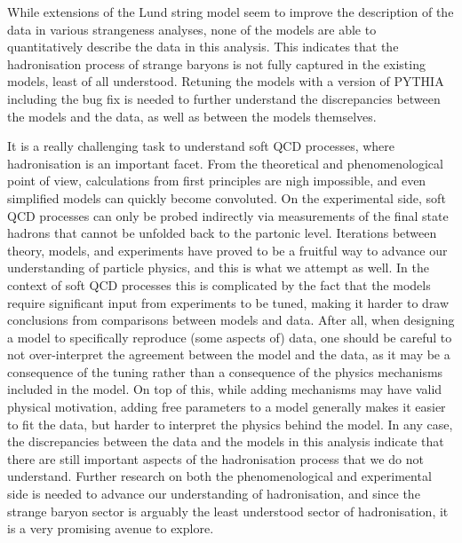   While extensions of the Lund string model seem to improve the description of the data in various strangeness analyses, none of the models are able to quantitatively describe the data in this analysis. This indicates that the hadronisation process of strange baryons is not fully captured in the existing models, least of all understood. Retuning the models with a version of PYTHIA including the bug fix is needed to further understand the discrepancies between the models and the data, as well as between the models themselves. %

  It is a really challenging task to understand soft QCD processes, where hadronisation is an important facet. From the theoretical and phenomenological point of view, calculations from first principles are nigh impossible, and even simplified models can quickly become convoluted. On the experimental side, soft QCD processes can only be probed indirectly via measurements of the final state hadrons that cannot be unfolded back to the partonic level. Iterations between theory, models, and experiments have proved to be a fruitful way to advance our understanding of particle physics, and this is what we attempt as well. In the context of soft QCD processes this is complicated by the fact that the models require significant input from experiments to be tuned, making it harder to draw conclusions from comparisons between models and data. After all, when designing a model to specifically reproduce (some aspects of) data, one should be careful to not over-interpret the agreement between the model and the data, as it may be a consequence of the tuning rather than a consequence of the physics mechanisms included in the model. On top of this, while adding mechanisms may have valid physical motivation, adding free parameters to a model generally makes it easier to fit the data, but harder to interpret the physics behind the model. In any case, the discrepancies between the data and the models in this analysis indicate that there are still important aspects of the hadronisation process that we do not understand. Further research on both the phenomenological and experimental side is needed to advance our understanding of hadronisation, and since the strange baryon sector is arguably the least understood sector of hadronisation, it is a very promising avenue to explore.

